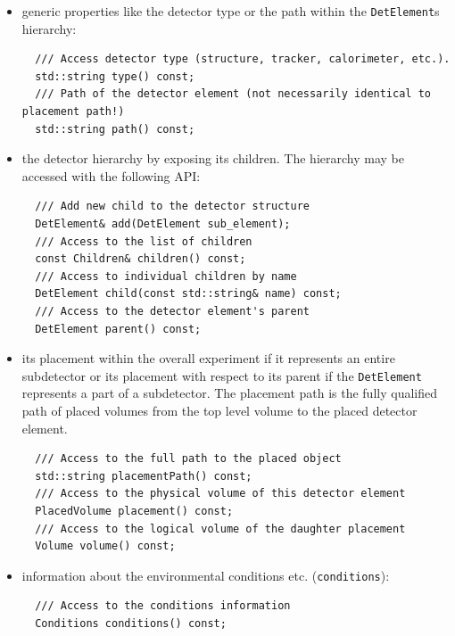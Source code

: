 \begin{itemize}
\item generic properties like the detector type or the path within the \texttt{DetElement}s hierarchy:
\begin{verbatim}
  /// Access detector type (structure, tracker, calorimeter, etc.).
  std::string type() const;
  /// Path of the detector element (not necessarily identical to placement path!)
  std::string path() const;
\end{verbatim}

\item the detector hierarchy by exposing its children. The hierarchy may be  accessed with the following API:
\begin{verbatim}
  /// Add new child to the detector structure
  DetElement& add(DetElement sub_element);
  /// Access to the list of children
  const Children& children() const;
  /// Access to individual children by name
  DetElement child(const std::string& name) const;
  /// Access to the detector element's parent
  DetElement parent() const;
\end{verbatim}

\item its placement within the overall experiment if it represents an entire subdetector or its placement with respect to its parent if the \texttt{DetElement} represents a part of a subdetector. The placement path is the fully qualified path of placed volumes  from the top level volume to the placed detector element. %
\begin{verbatim}
  /// Access to the full path to the placed object
  std::string placementPath() const;
  /// Access to the physical volume of this detector element
  PlacedVolume placement() const;
  /// Access to the logical volume of the daughter placement
  Volume volume() const;
\end{verbatim}

\item information about the environmental conditions etc. (\texttt{conditions}):
\begin{verbatim}
  /// Access to the conditions information 
  Conditions conditions() const;
\end{verbatim}


\end{itemize}
